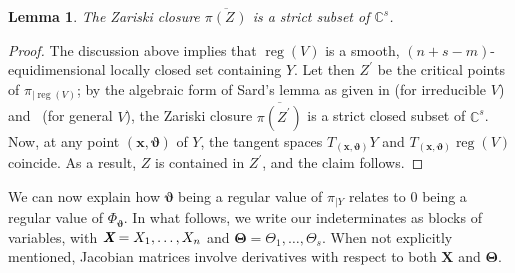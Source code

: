 \documentclass[12pt]{article}
\def\Xb{\textit{\textbf{X}}}
\def\Thetab{\bm{\Theta}}
\def\thetab{\bm{\vartheta}}
\def\xb{{\bm x}}
\DeclareMathOperator{\reg}{reg}
\def\C{\mathbb{C}}
\newtheorem{lemma}[theorem]{Lemma}
\begin{document}
\begin{lemma}
  The Zariski closure $\overline{\pi(Z^{})}$ is a strict subset of
  $\C^s$.
\end{lemma}
\begin{proof}
  The discussion above implies that $\reg(V)$ is a smooth,
  $(n+s-m)$-equidimensional locally closed set containing $Y$.  Let
  then $Z^{'}$ be the critical points of $\pi_{|\reg(V)}$; by the
  algebraic form of Sard's lemma as given in
  \cite[Theorem~3.7]{Mumford76} (for irreducible $V$)
  and~\cite[Proposition~B.2]{TWT} (for general $V$), the Zariski
  closure $\overline{\pi(Z^{'})}$ is a strict closed subset of
  $\C^s$. Now, at any point $(\xb,\thetab)$ of $Y$, the tangent spaces
  $T_{(\xb,\thetab)} Y$ and $T_{(\xb,\thetab)} \reg(V)$ coincide. As a
  result, $Z$ is contained in $Z^{'}$, and the claim follows.
\end{proof}

\noindent 
We can now explain how $\thetab$ being a regular value of $\pi_{|Y}$
relates to $0$ being a regular value of $\Phi_{\thetab}$.  In what
follows, we write our indeterminates as blocks of variables, with
$\Xb=X_1,\dots,X_n$ and $\Thetab = \Theta_1,\dots,\Theta_s$. When 
not explicitly mentioned, Jacobian matrices involve derivatives
with respect to both $\bm X$ and $\bm \Theta$.
\end{document}
